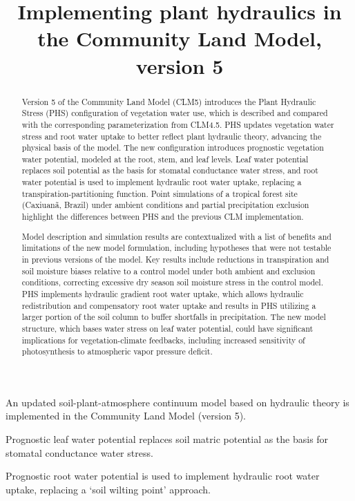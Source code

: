 \documentclass[draft,linenumbers]{agujournal}
\begin{document}
\title{Implementing plant hydraulics in the Community Land Model, version 5}



\begin{keypoints}
\item An updated soil-plant-atmosphere continuum model based on hydraulic theory is implemented in the Community Land Model (version 5).
\item Prognostic leaf water potential replaces soil matric potential as the basis for stomatal conductance water stress. 
\item Prognostic root water potential is used to implement hydraulic root water uptake, replacing a `soil wilting point' approach.
\end{keypoints}



\begin{abstract}
Version 5 of the Community Land Model (CLM5) introduces the Plant Hydraulic Stress (PHS) configuration of vegetation water use, which is described and compared with the corresponding parameterization from CLM4.5.
PHS updates vegetation water stress and root water uptake to better reflect plant hydraulic theory, advancing the physical basis of the model.
The new configuration introduces prognostic vegetation water potential, modeled at the root, stem, and leaf levels.
Leaf water potential replaces soil potential as the basis for stomatal conductance water stress, and
root water potential is used to implement hydraulic root water uptake, replacing a transpiration-partitioning function.
Point simulations of a tropical forest site (Caxiuan\~a, Brazil) under ambient conditions and partial precipitation exclusion highlight the differences between PHS and the previous CLM implementation.

Model description and simulation results are contextualized with a list of benefits and limitations of the new model formulation, including hypotheses that were not testable in previous versions of the model.
Key results include reductions in transpiration and soil moisture biases relative to a control model under both ambient and exclusion conditions, correcting excessive dry season soil moisture stress in the control model.
PHS implements hydraulic gradient root water uptake, which allows hydraulic redistribution and compensatory root water uptake and results in PHS utilizing a larger portion of the soil column to buffer shortfalls in precipitation.
The new model structure, which bases water stress on leaf water potential, could have significant implications for vegetation-climate feedbacks, including increased sensitivity of photosynthesis to atmospheric vapor pressure deficit.
\end{abstract}
\end{document}
